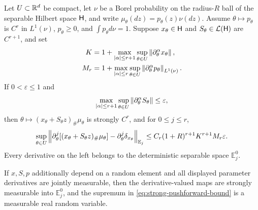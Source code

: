 \begin{lemma}
\label{lem:strong-pushforward}
Let \(U\subset\mathbb R^d\) be compact, let \(\nu\) be a Borel probability on the
radius-\(R\) ball of the separable Hilbert space \(\mathsf H\), and write
\(\mu_\theta(dz)=p_\theta(z)\nu(dz)\).  Assume
\(\theta\mapsto p_\theta\) is \(C^r\) in \(L^1(\nu)\),
\(p_\theta\ge0\), and \(\int p_\theta d\nu=1\).  Suppose
\(x_\theta\in\mathsf H\) and \(S_\theta\in\mathcal L(\mathsf H)\) are
\(C^{r+1}\), and set
\begin{align*}
 K&=1+\max_{\left|\alpha\right|\le r+1}\sup_{\theta\in U}
       \left\|\partial_\theta^\alpha x_\theta\right\|,\\
 M_r&=1+\max_{\left|\alpha\right|\le r}\sup_{\theta\in U}
       \left\|\partial_\theta^\alpha p_\theta\right\|_{L^1(\nu)}.
\end{align*}
If \(0<\varepsilon\le1\) and
\[
 \max_{\left|\alpha\right|\le r+1}\sup_{\theta\in U}
 \left\|\partial_\theta^\alpha S_\theta\right\|\le\varepsilon,
\]
then \(\theta\mapsto(x_\theta+S_\theta z)_\#\mu_\theta\) is strongly
\(C^r\), and for \(0\le j\le r\),
\begin{equation}
 \sup_{\theta\in U}
 \left\|\partial_\theta^j[(x_\theta+S_\theta z)_\#\mu_\theta]
       -\partial_\theta^j\delta_{x_\theta}\right\|_{\mathbb E_j}
 \le C_r(1+R)^{r+1}K^{r+1}M_r\varepsilon.
 \label{eq:strong-pushforward-bound}
\end{equation}
Every derivative on the left belongs to the deterministic separable space
\(\mathbb E_j^0\).

If \(x,S,p\) additionally depend on a random element and all displayed
parameter derivatives are jointly measurable, then the derivative-valued
maps are strongly measurable into \(\mathbb E_j^0\), and the supremum in
\eqref{eq:strong-pushforward-bound} is a measurable real random variable.
\end{lemma}

